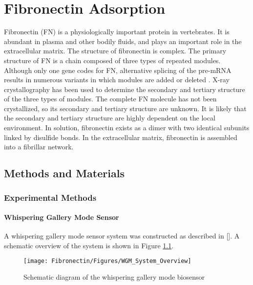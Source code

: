 
\chapter{Fibronectin Adsorption}

Fibronectin (FN) is a physiologically important protein in vertebrates.
It is abundant in plasma and other bodily fluids, and plays an important
role in the extracellular matrix. The structure of fibronectin is
complex. The primary structure of FN is a chain composed of three
types of repeated modules. Although only one gene codes for FN, alternative
splicing of the pre-mRNA results in numerous variants in which modules
are added or deleted \cite{Pankov2002}. X-ray crystallography has
been used to determine the secondary and tertiary structure of the
three types of modules. The complete FN molecule has not been crystallized,
so its secondary and tertiary structure are unknown. It is likely
that the secondary and tertiary structure are highly dependent on
the local environment. In solution, fibronectin exists as a dimer
with two identical subunits linked by disulfide bonds. In the extracellular
matrix, fibronectin is assembled into a fibrillar network\cite{Mao2005}.


\section{Methods and Materials}


\subsection{Experimental Methods}


\subsubsection*{Whispering Gallery Mode Sensor}

A whispering gallery mode sensor system was constructed as described
in {[}{]}. A schematic overview of the system is shown in Figure \ref{fig:WGM System Diagram}.%
\begin{figure}
\texttt{[image: Fibronectin/Figures/WGM\_System\_Overview]}

\caption{\label{fig:WGM System Diagram}Schematic diagram of the whispering
gallery mode biosensor}



\end{figure}




